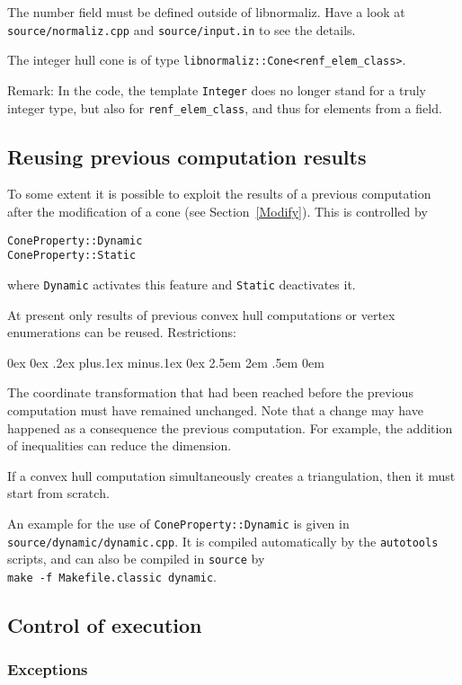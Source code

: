 \documentclass[12pt,a4paper]{scrartcl}
\newcounter{listi}
\newcommand{\stdli}{ \topsep0ex \partopsep0ex %
\parsep.2ex plus.1ex minus.1ex \itemsep0ex%
\leftmargin2.5em \labelwidth2em \labelsep.5em \rightmargin0em}%
\newenvironment{arab}{\begin{list}{\textup{(\arabic{listi})}}%
	{\usecounter{listi}\stdli}}{\end{list}}
\theoremstyle{definition}
\def\ttt{\texttt}
\begin{document}
\begin{small}
The number field must be defined outside of libnormaliz. Have a look at \verb|source/normaliz.cpp| and \verb|source/input.in| to see the details.

The integer hull cone is of type \verb|libnormaliz::Cone<renf_elem_class>|.

Remark: In the code, the template \ttt{Integer} does no longer stand for a truly integer type, but also for \verb|renf_elem_class|, and thus for elements from a field.

\subsection{Reusing previous computation results}

To some extent it is possible to exploit the results of a previous computation after the modification of a cone (see Section~\ref{Modify}). This is controlled by
\begin{Verbatim}
ConeProperty::Dynamic
ConeProperty::Static
\end{Verbatim}
where \verb|Dynamic| activates this feature and \verb|Static| deactivates it.

At present only results of previous convex hull computations or vertex enumerations can be reused. Restrictions:
\begin{arab}
	\item The coordinate transformation that had been reached before the previous computation must have remained unchanged. Note that a change may have happened as a consequence the previous computation. For example, the addition of inequalities can reduce the dimension.
	\item If a convex hull computation simultaneously creates a triangulation, then it must start from scratch.
\end{arab}

An example for the use of \verb|ConeProperty::Dynamic| is given in \verb|source/dynamic/dynamic.cpp|. It is compiled automatically by the \verb|autotools| scripts, and can also be compiled in \verb|source| by\\ \verb|make -f Makefile.classic dynamic|.

\subsection{Control of execution}

\subsubsection{Exceptions}


\end{small}
\end{document}
